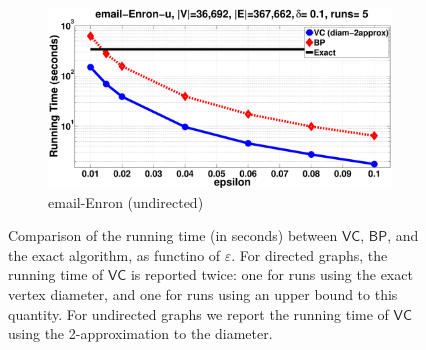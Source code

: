 \begin{figure}[htbp]
  \begin{subfigure}[b]{1\textwidth}
    \includegraphics[width=1\textwidth,height=0.19\textheight]{figures/eps/email-Enron-time}
    \caption{email-Enron (undirected)}
    \label{fig:email:time}
  \end{subfigure}
  \caption{Comparison of the running time (in seconds) between $\mathsf{VC}$,
  $\mathsf{BP}$, and the exact algorithm, as functino of $\varepsilon$. For
  directed graphs, the running time of $\mathsf{VC}$ is reported twice: one for
  runs using the exact vertex diameter, and one for runs using an upper bound to
  this quantity. For undirected graphs we report the running time of
  $\mathsf{VC}$ using the 2-approximation to the diameter.}
  \label{fig:time}
\end{figure}
